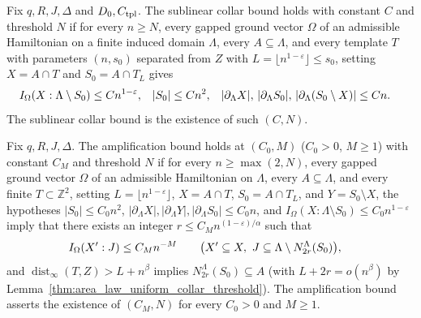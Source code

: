 \begin{definition}
    \label{def:area_law_collar_bound}
    \leanok
    Fix $q,R,J,\Delta$ and $D_0,C_{\rm tpl}$. The sublinear collar bound
    \cite[Proposition~9.6]{OpenAI2026AreaLaw} holds with constant $C$ and
    threshold $N$ if for every $n\ge N$, every gapped ground vector $\Omega$ of
    an admissible Hamiltonian on a finite induced domain $\Lambda$, every
    $A\subseteq\Lambda$, and every template $T$ with parameters $(n,s_0)$
    separated from $Z$ with $L=\lfloor n^{1-\varepsilon}\rfloor\le s_0$, setting
    $X=A\cap T$ and $S_0=A\cap T_L$ gives
    \begin{align}
        I_\Omega(X:\Lambda\setminus S_0)                                                   & \le Cn^{1-\varepsilon}, &
        |S_0|                                                                              & \le Cn^2,               &
        |\partial_\Lambda X|,\,|\partial_\Lambda S_0|,\,|\partial_\Lambda(S_0\setminus X)| & \le Cn.\notag
    \end{align}
    The sublinear collar bound is the existence of such $(C,N)$.
\end{definition}

\begin{definition}
    \label{def:area_law_amplification_bound}
    \leanok
    Fix $q,R,J,\Delta$. The amplification bound
    \cite[Proposition~10.2]{OpenAI2026AreaLaw} holds at $(C_0,M)$ ($C_0>0$,
    $M\ge1$) with constant $C_M$ and threshold $N$ if for every
    $n\ge\max(2,N)$, every gapped ground vector $\Omega$ of an admissible
    Hamiltonian on $\Lambda$, every $A\subseteq\Lambda$, and every finite
    $T\subset\mathbb Z^2$, setting $L=\lfloor n^{1-\varepsilon}\rfloor$,
    $X=A\cap T$, $S_0=A\cap T_L$, and $Y=S_0\setminus X$, the hypotheses
    $|S_0|\le C_0n^2$, $|\partial_\Lambda X|,|\partial_\Lambda Y|,|\partial_\Lambda S_0|\le C_0n$,
    and $I_\Omega(X:\Lambda\setminus S_0)\le C_0n^{1-\varepsilon}$ imply that
    there exists an integer $r\le C_Mn^{(1-\varepsilon)/\alpha}$ such that
    \begin{align}
        I_\Omega(X':J) & \le C_Mn^{-M}
        \qquad\bigl(X'\subseteq X,\ J\subseteq\Lambda\setminus N_{2r}^\Lambda(S_0)\bigr),\notag
    \end{align}
    and $\operatorname{dist}_\infty(T,Z)>L+n^\beta$ implies
    $N_{2r}^\Lambda(S_0)\subseteq A$ (with $L+2r=o(n^\beta)$ by
    Lemma~\ref{thm:area_law_uniform_collar_threshold}). The amplification
    bound asserts the existence of $(C_M,N)$ for every $C_0>0$ and $M\ge1$.
\end{definition}

